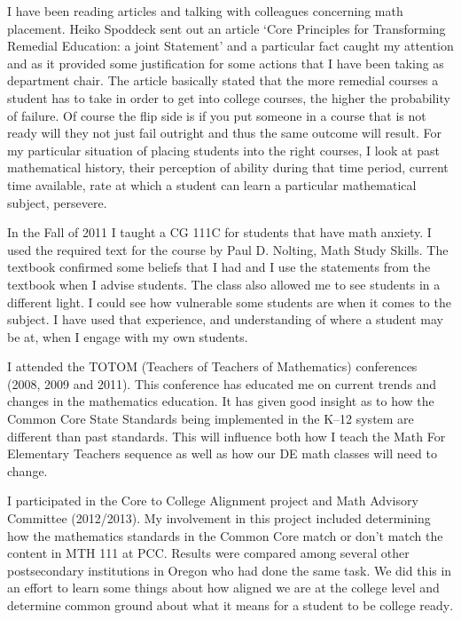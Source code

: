 \begin{description}[style=nextline]
	\item[Henry Mesa (Faculty Chair, Rock Creek Campus)]
	I have been reading articles and talking with colleagues concerning math
	placement.  Heiko Spoddeck sent out an article `Core Principles for
	Transforming Remedial Education: a joint Statement'  and a particular fact
	caught my attention and as it provided some justification for some actions that
	I have been taking as department chair.  The article basically stated that the
	more remedial courses a student has to take in order to get into college
	courses, the higher the probability of failure.  Of course the flip side is if
	you put someone in a course that is not ready will they not just fail outright
	and thus the same outcome will result.   For my particular situation of placing
	students into the right courses, I look at past mathematical history, their
	perception of ability during that time period, current time available, rate at
	which a student can learn a particular mathematical subject, persevere.

	In the Fall of 2011 I taught a CG 111C for students that have math anxiety.  I
	used the required text for the course by Paul D. Nolting, Math Study
	Skills.  The textbook confirmed some beliefs that I had and I use the
	statements from the textbook when I advise students.   The class also allowed
	me to see students in a
	different light. I could see how vulnerable some students are when it comes to
	the subject.  I have used that experience, and understanding of where a student
	may be at, when I engage with my own students.

	\item[Emily Nelson (Full-time Instructor, Rock Creek Campus)]
	I attended the TOTOM (Teachers of Teachers of Mathematics) conferences (2008,
	2009 and 2011).  This conference has educated me on current trends and changes
	in the mathematics education.  It has given good insight as to how the Common
	Core State Standards being implemented in the K--12 system are different than
	past standards. This will influence both how I teach the Math For Elementary
	Teachers sequence as well as how our DE math classes will need to change.

	I participated in the Core to College Alignment project and Math Advisory
	Committee (2012/2013).  My involvement in this project included determining how
	the mathematics standards in the Common Core match or don't match the
	content in MTH 111 at PCC. Results were compared among several other
	postsecondary institutions in Oregon who had done the same task.  We did this
	in an effort to learn some things about how aligned we are at the college level
	and determine common ground about what it means for a student to be college ready.


\end{description}
